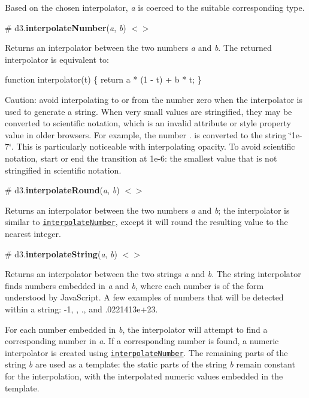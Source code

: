Based on the chosen interpolator, {\itshape a} is coerced to the suitable corresponding type.

\label{_interpolateNumber}%
\# d3.{\bfseries interpolate\+Number}({\itshape a}, {\itshape b}) \href{https://github.com/d3/d3-interpolate/blob/master/src/number.js}{\tt $<$$>$}

Returns an interpolator between the two numbers {\itshape a} and {\itshape b}. The returned interpolator is equivalent to\+:


\begin{DoxyCode}
function interpolator(t) \{
  return a * (1 - t) + b * t;
\}
\end{DoxyCode}


Caution\+: avoid interpolating to or from the number zero when the interpolator is used to generate a string. When very small values are stringified, they may be converted to scientific notation, which is an invalid attribute or style property value in older browsers. For example, the number {.} is converted to the string {\ttfamily \char`\"{}1e-\/7\char`\"{}}. This is particularly noticeable with interpolating opacity. To avoid scientific notation, start or end the transition at 1e-\/6\+: the smallest value that is not stringified in scientific notation.

\label{_interpolateRound}%
\# d3.{\bfseries interpolate\+Round}({\itshape a}, {\itshape b}) \href{https://github.com/d3/d3-interpolate/blob/master/src/round.js}{\tt $<$$>$}

Returns an interpolator between the two numbers {\itshape a} and {\itshape b}; the interpolator is similar to \href{#interpolateNumber}{\tt interpolate\+Number}, except it will round the resulting value to the nearest integer.

\label{_interpolateString}%
\# d3.{\bfseries interpolate\+String}({\itshape a}, {\itshape b}) \href{https://github.com/d3/d3-interpolate/blob/master/src/string.js}{\tt $<$$>$}

Returns an interpolator between the two strings {\itshape a} and {\itshape b}. The string interpolator finds numbers embedded in {\itshape a} and {\itshape b}, where each number is of the form understood by Java\+Script. A few examples of numbers that will be detected within a string\+: {\ttfamily -\/1}, {}, {.}, and {.\+0221413e+23}.

For each number embedded in {\itshape b}, the interpolator will attempt to find a corresponding number in {\itshape a}. If a corresponding number is found, a numeric interpolator is created using \href{#interpolateNumber}{\tt interpolate\+Number}. The remaining parts of the string {\itshape b} are used as a template\+: the static parts of the string {\itshape b} remain constant for the interpolation, with the interpolated numeric values embedded in the template.

